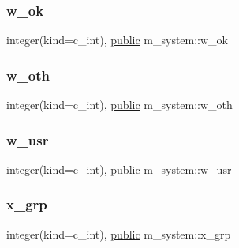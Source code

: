 \mbox{\label{namespacem__system_a05afbb3a08aad5483f51570d6fbccd77}} 
\subsubsection{\texorpdfstring{w\+\_\+ok}{w\_ok}}
{\footnotesize\ttfamily integer(kind=c\+\_\+int), \hyperlink{M__stopwatch_83_8txt_a2f74811300c361e53b430611a7d1769f}{public} m\+\_\+system\+::w\+\_\+ok}

\mbox{\label{namespacem__system_a1801bba1e36a51345d442f73839c93d2}} 
\subsubsection{\texorpdfstring{w\+\_\+oth}{w\_oth}}
{\footnotesize\ttfamily integer(kind=c\+\_\+int), \hyperlink{M__stopwatch_83_8txt_a2f74811300c361e53b430611a7d1769f}{public} m\+\_\+system\+::w\+\_\+oth}

\mbox{\label{namespacem__system_a7d9b4b9dbb20baaf8793f8fa07f7e0bc}} 
\subsubsection{\texorpdfstring{w\+\_\+usr}{w\_usr}}
{\footnotesize\ttfamily integer(kind=c\+\_\+int), \hyperlink{M__stopwatch_83_8txt_a2f74811300c361e53b430611a7d1769f}{public} m\+\_\+system\+::w\+\_\+usr}

\mbox{\label{namespacem__system_ad6577311415ac3c4a747b5cbbbfe1c2b}} 
\subsubsection{\texorpdfstring{x\+\_\+grp}{x\_grp}}
{\footnotesize\ttfamily integer(kind=c\+\_\+int), \hyperlink{M__stopwatch_83_8txt_a2f74811300c361e53b430611a7d1769f}{public} m\+\_\+system\+::x\+\_\+grp}

